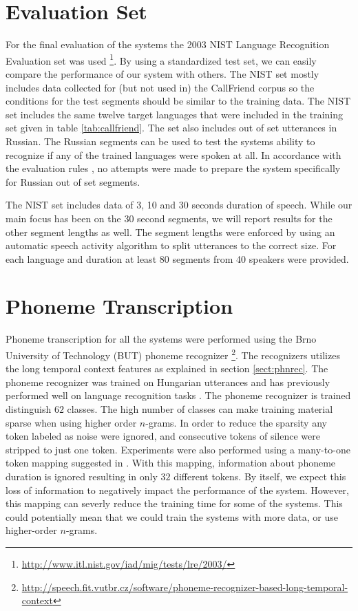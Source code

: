\section{Evaluation Set}

For the final evaluation of the systems the 2003 NIST Language Recognition Evaluation set was used \footnote{\url{http://www.itl.nist.gov/iad/mig/tests/lre/2003/}}. By using a standardized test set, we can easily compare the performance of our system with others. The NIST set mostly includes data collected for (but not used in) the CallFriend corpus \cite{martin2003nist} so the conditions for the test segments should be similar to the training data. The NIST set includes the same twelve target languages that were included in the training set given in table \ref{tab:callfriend}. The set also includes out of set utterances in Russian. The Russian segments can be used to test the systems ability to recognize if any of the trained languages were spoken at all. In accordance with the evaluation rules \cite{martin2003nist}, no attempts were made to prepare the system specifically for Russian out of set segments.

The NIST set includes data of 3, 10 and 30 seconds duration of speech. While our main focus has been on the 30 second segments, we will report results for the other segment lengths as well. The segment lengths were enforced by using an automatic speech activity algorithm to split utterances to the correct size. For each language and duration at least 80 segments from 40 speakers were provided. 

\section{Phoneme Transcription}
\label{sect:phonetranscription}

Phoneme transcription for all the systems were performed using the Brno University of Technology (BUT) phoneme recognizer \footnote{\url{http://speech.fit.vutbr.cz/software/phoneme-recognizer-based-long-temporal-context}}. The recognizers utilizes the long temporal context features as explained in section \ref{sect:phnrec}. The phoneme recognizer was trained on Hungarian utterances and has previously performed well on language recognition tasks \cite{lrivector, torres2008mitll}. The phoneme recognizer is trained distinguish $62$ classes. The high number of classes can make training material sparse when using higher order $n$-grams. In order to reduce the sparsity any token labeled as noise were ignored, and consecutive tokens of silence were stripped to just one token. Experiments were also performed using a many-to-one token mapping suggested in \cite{torres2008mitll}. With this mapping, information about phoneme duration is ignored resulting in only $32$ different tokens. By itself, we expect this loss of information to negatively impact the performance of the system. However, this mapping can severly reduce the training time for some of the systems. This could potentially mean that we could train the systems with more data, or use higher-order $n$-grams.

